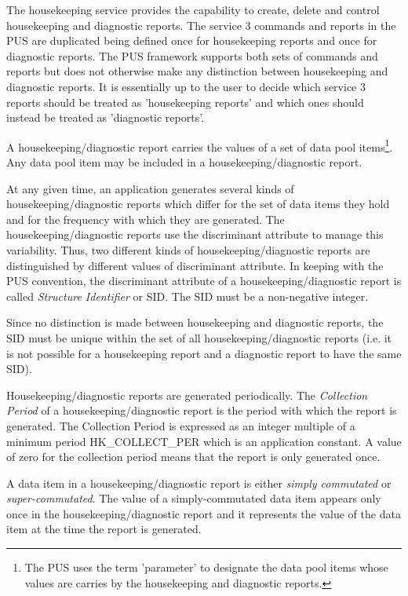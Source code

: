\documentclass[a4paper,10pt]{article}
\begin{document}
The housekeeping service provides the capability to create, delete and control housekeeping and diagnostic reports. The service 3 commands and reports in the PUS are duplicated being defined once for housekeeping reports and once for diagnostic reports. The PUS framework supports both sets of commands and reports but does not otherwise make any distinction between housekeeping and diagnostic reports. It is essentially up to the user to decide which service 3 reports should be treated as 'housekeeping reports' and which ones should instead be treated as 'diagnostic reports'.

A housekeeping/diagnostic report carries the values of a set of data pool items\footnote{The PUS uses the term 'parameter' to designate the data pool items whose values are carries by the housekeeping and diagnostic reports.}. Any data pool item may be included in a housekeeping/diagnostic report. 

At any given time, an application generates several kinds of housekeeping/diagnostic reports which differ for the set of data items they hold and for the frequency with which they are generated. The housekeeping/diagnostic reports use the discriminant attribute to manage this variability. Thus, two different kinds of housekeeping/diagnostic reports are distinguished by different values of discriminant attribute. In keeping with the PUS convention, the discriminant attribute of a housekeeping/diagnostic report is called \textit{Structure Identifier} or SID. The SID must be a non-negative integer. 

Since no distinction is made between housekeeping and diagnostic reports, the SID must be unique within the set of all housekeeping/diagnostic reports (i.e. it is not possible for a housekeeping report and a diagnostic report to have the same SID).

Housekeeping/diagnostic reports are generated periodically. The \textit{Collection Period} of a housekeeping/diagnostic report is the period with which the report is generated. The Collection Period is expressed as an integer multiple of a minimum period HK\_COLLECT\_PER which is an application constant. A value of zero for the collection period means that the report is only generated once.

A data item in a housekeeping/diagnostic report is either \textit{simply commutated} or \textit{super-commutated}. The value of a simply-commutated data item appears only once in the housekeeping/diagnostic report and it represents the value of the data item at the time the report is generated.
\end{document}
